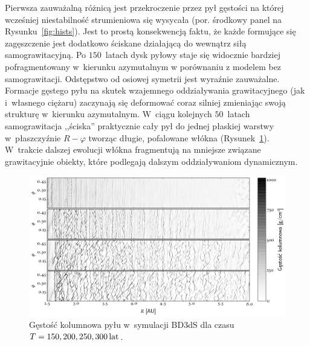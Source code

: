 %
Pierwsza zauważalną różnicą jest przekroczenie przez pył gęstości na której
wcześniej niestabilność strumieniowa się wysycała (por. środkowy panel na
Rysunku~\ref{fig:hists}). Jest to prostą konsekwencją faktu, że każde formujące
się zagęszczenie jest dodatkowo ściskane działającą do wewnątrz siłą
samograwitacyjną. Po $150$~latach dysk pyłowy staje się widocznie bardziej
pofragmentowany w~kierunku azymutalnym w porównaniu z modelem bez
samograwitacji.  Odstępstwo od osiowej symetrii jest wyraźnie zauważalne.
Formacje gęstego pyłu na skutek wzajemnego oddziaływania grawitacyjnego (jak
i~własnego ciężaru) zaczynają się deformować coraz silniej zmieniając swoją
strukturę w~kierunku azymutalnym. W~ciągu kolejnych $50$~latach samograwitacja
,,ściska'' praktycznie cały pył do jednej płaskiej warstwy w~płaszczyźnie $R -
\varphi$ tworząc długie, pofalowane włókna (Rysunek~\ref{fig:projs}). W~trakcie
dalszej ewolucji włókna fragmentują na mniejsze związane grawitacyjnie obiekty,
które podlegają dalszym oddziaływaniom dynamicznym. 
%
\begin{figure}
   \centering
   \includegraphics[width=0.95\linewidth]{figures/proj_sg}
   \caption{Gęstość kolumnowa pyłu w~symulacji BD3dS dla czasu $T=150, 200, 250,
   300\hbox{$\thinspace\textrm{lat}$}$.}
   \label{fig:projs}
\end{figure}
%
